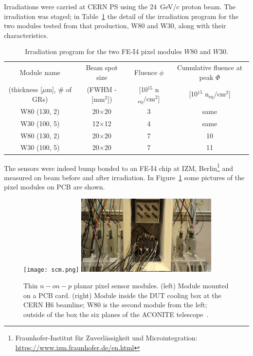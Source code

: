 Irradiations were carried at CERN PS using the 24~GeV/c proton beam. The irradiation was staged; 
in Table~\ref{tab:W30W80Irr} the detail of the irradiation program for the two modules tested from 
that production, W80 and W30, along with their characteristics.  
\begin{table}[!htpb]
\caption{\label{tab:W30W80Irr}Irradiation program for the two FE-I4 pixel modules $W80$ and $W30$.}
\centering
\begin{tabular}{cccc}
\hline 
\hline
Module name & Beam spot size & Fluence $\phi$& Cumulative fluence at  peak $\Phi$\\ 
(thickness [$\mu$m], \# of GRs) & (FWHM - [mm$^2$]) &  [10$^{15}$ n$_\text{eq}/\text{cm}^2$]  &  [10$^{15}$ n$_\text{eq}/\text{cm}^2$] \\
\hline
W80 (130, 2) & 20$\times$20 & 3 & same\\
\hline
W30 (100, 5) & 12$\times$12 & 4 & same\\
\hline
\hline
W80 (130, 2) & 20$\times$20 & 7 & 10 \\
\hline
W30 (100, 5) & 20$\times$20 & 7 & 11\\
\hline
\end{tabular}
\end{table}

The sensors were indeed bump bonded to an FE-I4 chip at IZM, 
Berlin\footnote{Fraunhofer-Institut f\"ur Zuverl\"assigkeit und Microintegration: \url{https://www.izm.fraunhofer.de/en.html}} and measured 
on beam before and after irradiation. In Figure~\ref{fig:W80W30} some pictures of the pixel modules on 
PCB are shown. 
\begin{figure}[!htpb]
\centering
\texttt{[image: scm.png]}
\includegraphics[width=0.63\textwidth]{in_the_box.jpeg}
\caption{\label{fig:W80W30}Thin $n-on-p$ planar pixel sensor modules. (left) Module mounted 
on a PCB card. (right) Module inside 
the DUT cooling box at the CERN H6 beamline; W80 is the second module from the left; outside 
of the box the six planes of the ACONITE telescope~\cite{Jansen2016}.}
\end{figure}

